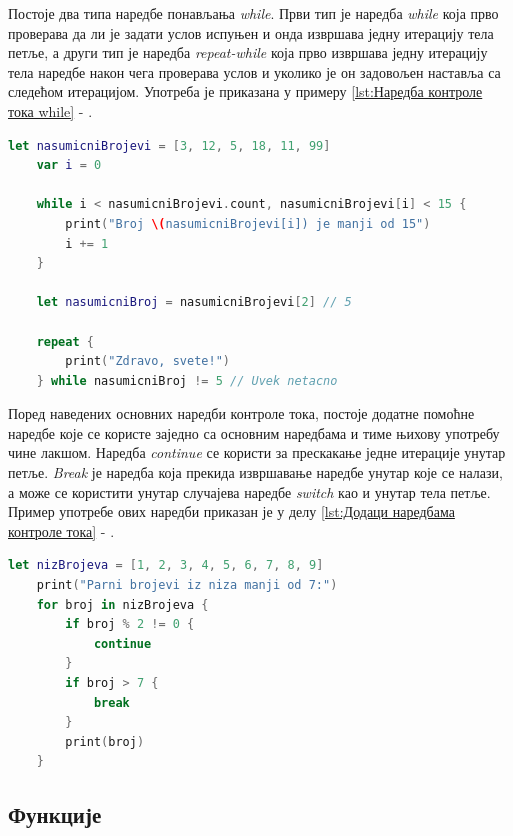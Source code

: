 \documentclass[12pt,oneside]{memoir}
\begin{document}
\indent Постоје два типа наредбе понављања \textit{while}. Први тип је наредба \textit{while} која прво проверава да ли је задати услов испуњен и онда извршава једну итерацију тела петље, а други тип је наредба \textit{repeat-while} која прво извршава једну итерацију тела наредбе након чега проверава услов и уколико је он задовољен наставља са следећом итерацијом. Употреба је приказана у примеру \ref{lst:Наредба контроле тока while} - . 

\begin{lstlisting}[caption=\textit{{Наредба контроле тока while}}, label={lst:Наредба контроле тока while}, language=Swift, frame=single]
    let nasumicniBrojevi = [3, 12, 5, 18, 11, 99]
    var i = 0
    
    while i < nasumicniBrojevi.count, nasumicniBrojevi[i] < 15 {
        print("Broj \(nasumicniBrojevi[i]) je manji od 15")
        i += 1
    }
    
    let nasumicniBroj = nasumicniBrojevi[2] // 5
    
    repeat {
        print("Zdravo, svete!")
    } while nasumicniBroj != 5 // Uvek netacno
\end{lstlisting}

\indent Поред наведених основних наредби контроле тока, постоје додатне помоћне наредбе које се користе заједно са основним наредбама и тиме њихову употребу чине лакшом. Наредба \textit{continue} се користи за прескакање једне итерације унутар петље. \textit{Break} је наредба која прекида извршавање наредбе унутар које се налази, а може се користити унутар случајева наредбе \textit{switch} као и унутар тела петље. Пример употребе ових наредби приказан је у делу \ref{lst:Додаци наредбама контроле тока} - .

\begin{lstlisting}[caption=\textit{{Додаци наредбaма контроле тока}}, label={lst:Додаци наредбама контроле тока}, language=Swift, frame=single]
    let nizBrojeva = [1, 2, 3, 4, 5, 6, 7, 8, 9]
    print("Parni brojevi iz niza manji od 7:")
    for broj in nizBrojeva {
        if broj % 2 != 0 {
            continue
        }
        if broj > 7 {
            break
        }
        print(broj)
    }
\end{lstlisting}

\subsection{Функције}
\end{document}
